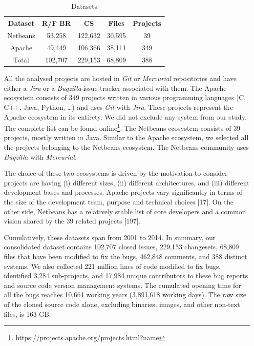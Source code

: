 \documentclass[12pt]{report}
\begin{document}
\begin{table}[h]
\begin{center}
\begin{tabular}{@{}c|c|c|c|c@{}}
\textbf{Dataset} & \textbf{R/F BR} & \textbf{CS} & \textbf{Files} & \textbf{Projects} \\ \hline \hline
Netbeans         & 53,258          & 122,632     & 30,595         & 39                \\
Apache           & 49,449          & 106,366     & 38,111         & 349               \\
Total            & 102,707         & 229,153     & 68,809         & 388               \\ \hline \hline

\end{tabular}
\end{center}

\caption{Datasets\label{table:datasets}}
\end{table}

All the analysed projects are hosted in \emph{Git} or \emph{Mercurial}
repositories and have either a \emph{Jira} or a \emph{Bugzilla} issue
tracker associated with them. The Apache ecosystem consists of 349
projects written in various programming languages (C, C++, Java, Python,
\ldots{}) and uses \emph{Git} with \emph{Jira}. These projects represent
the Apache ecosystem in its entirety. We did not exclude any system from
our study. The complete list can be found
online\footnote{https://projects.apache.org/projects.html?name}. The
Netbeans ecosystem consists of 39 projects, mostly written in Java.
Similar to the Apache ecosystem, we selected all the projects belonging
to the Netbeans ecosystem. The Netbeans community uses \emph{Bugzilla}
with \emph{Mercurial}.

The choice of these two ecosystems is driven by the motivation to
consider projects are having (i) different sizes, (ii) different
architectures, and (iii) different development bases and processes.
Apache projects vary significantly in terms of the size of the
development team, purpose and technical choices {[}17{]}. On the other
side, Netbeans has a relatively stable list of core developers and a
common vision shared by the 39 related projects {[}197{]}.

Cumulatively, these datasets span from 2001 to 2014. In summary, our
consolidated dataset contains 102,707 closed issues, 229,153 changesets,
68,809 files that have been modified to fix the bugs, 462,848 comments,
and 388 distinct systems. We also collected 221 million lines of code
modified to fix bugs, identified 3,284 sub-projects, and 17,984 unique
contributors to these bug reports and source code version management
systems. The cumulated opening time for all the bugs reaches 10,661
working years (3,891,618 working days). The raw size of the cloned
source code alone, excluding binaries, images, and other non-text files,
is 163 GB.
\end{document}

